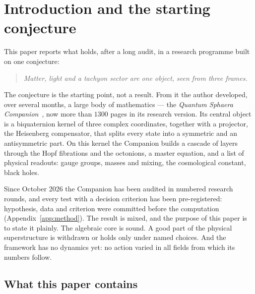 \section{Introduction and the starting conjecture}\label{sec:intro}

This paper reports what holds, after a long audit, in a research programme built on one conjecture:

\begin{quote}
\emph{Matter, light and a tachyon sector are one object, seen from three frames.}
\end{quote}

The conjecture is the starting point, not a result.  From it the author developed, over several months, a large body of mathematics
--- the \emph{Quantum Sphaera Companion}~\cite{companion}, now more than \(1300\) pages in its research version.  Its central object is a
biquaternion kernel of three complex coordinates, together with a projector, the Heisenberg compensator, that splits every state into a
symmetric and an antisymmetric part.  On this kernel the Companion builds a cascade of layers through the Hopf fibrations and the
octonions, a master equation, and a list of physical readouts: gauge groups, masses and mixing, the cosmological constant, black holes.

Since October 2026 the Companion has been audited in numbered research rounds, and every test with a decision criterion has
been pre-registered: hypothesis, data and criterion were committed before the computation (Appendix~\ref{app:method}).  The result
is mixed, and the purpose of this paper is to state it plainly.  The algebraic core is sound.  A good part of the physical superstructure
is withdrawn or holds only under named choices.  And the framework has no dynamics yet: no action varied in all fields from which its
numbers follow.

\subsection{What this paper contains}

